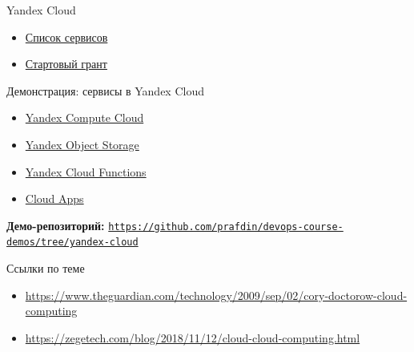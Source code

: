 \documentclass[aspectratio=169]{beamer}
\begin{document}
    \begin{frame}{Yandex Cloud}
        \begin{itemize}
            \item \href{https://yandex.cloud/ru/docs/overview/concepts/services}{Список сервисов}
            \item \href{https://yandex.cloud/ru/docs/getting-started/usage-grant}{Стартовый грант}
        \end{itemize}
    \end{frame}

    \begin{frame}{Демонстрация: сервисы в Yandex Cloud}
        \begin{itemize}
            \item \href{https://yandex.cloud/ru/docs/compute/}{Yandex Compute Cloud}
            \item \href{https://yandex.cloud/ru/docs/storage/}{Yandex Object Storage}
            \item \href{https://yandex.cloud/ru/docs/functions/}{Yandex Cloud Functions}
            \item \href{https://yandex.cloud/ru/docs/cloud-apps/}{Cloud Apps}
        \end{itemize}
        \vspace{0.2cm}
        \textbf{Демо-репозиторий:}
        \href{https://github.com/prafdin/devops-course-demos/tree/yandex-cloud}{\texttt{https://github.com/prafdin/devops-course-demos/tree/yandex-cloud}}
    \end{frame}

    \begin{frame}{Ссылки по теме}
        \begin{itemize}
            \item \url{https://www.theguardian.com/technology/2009/sep/02/cory-doctorow-cloud-computing}
            \item \url{https://zegetech.com/blog/2018/11/12/cloud-cloud-computing.html}
        \end{itemize}
    \end{frame}
\end{document}
